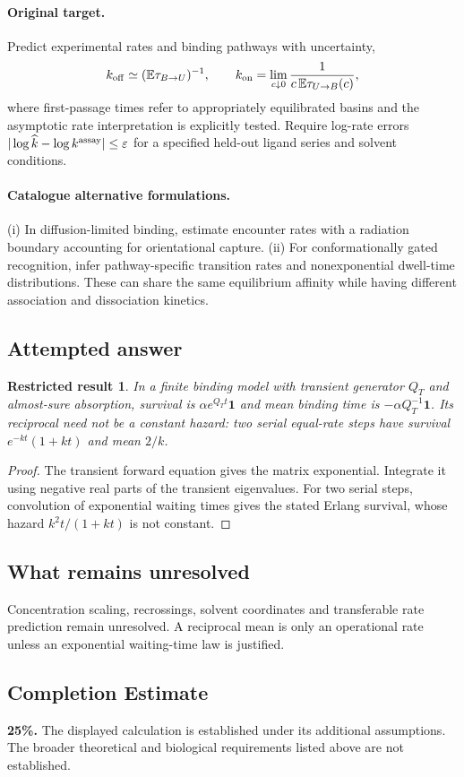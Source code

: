 \documentclass[11pt]{article}
\newcommand{\E}{\mathbb E}
\providecommand{\E}{\mathbb E}
\newtheorem{attemptresult}{Restricted result}[section]
\begin{document}
\paragraph{Original target.}
Predict experimental rates and binding pathways with uncertainty,
\[k_{\rm off}\simeq(\E\tau_{B\to U})^{-1},\qquad k_{\rm on}=\lim_{c\downarrow0}\frac{1}{c\,\E\tau_{U\to B}(c)},\]
where first-passage times refer to appropriately equilibrated basins and the asymptotic rate interpretation is explicitly tested. Require log-rate errors $|\log\widehat k-\log k^{\rm assay}|\le\varepsilon$ for a specified held-out ligand series and solvent conditions.
\paragraph{Catalogue alternative formulations.}
(i) In diffusion-limited binding, estimate encounter rates with a radiation boundary accounting for orientational capture. (ii) For conformationally gated recognition, infer pathway-specific transition rates and nonexponential dwell-time distributions. These can share the same equilibrium affinity while having different association and dissociation kinetics.
\subsection{Attempted answer}
\begin{attemptresult}
In a finite binding model with transient generator $Q_T$ and almost-sure absorption, survival is $\alpha e^{Q_Tt}\mathbf1$ and mean binding time is $-\alpha Q_T^{-1}\mathbf1$. Its reciprocal need not be a constant hazard: two serial equal-rate steps have survival $e^{-kt}(1+kt)$ and mean $2/k$.
\end{attemptresult}
\begin{proof}
The transient forward equation gives the matrix exponential. Integrate it using negative real parts of the transient eigenvalues. For two serial steps, convolution of exponential waiting times gives the stated Erlang survival, whose hazard $k^2t/(1+kt)$ is not constant.
\end{proof}
\subsection{What remains unresolved}
Concentration scaling, recrossings, solvent coordinates and transferable rate prediction remain unresolved. A reciprocal mean is only an operational rate unless an exponential waiting-time law is justified.
\subsection{Completion Estimate}
\textbf{25\%.} The displayed calculation is established under its additional assumptions. The broader theoretical and biological requirements listed above are not established.
\end{document}
